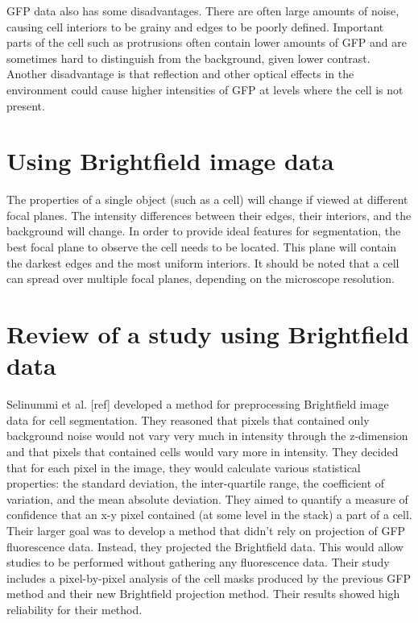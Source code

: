 GFP data also has some disadvantages. There are often large amounts of noise, causing cell interiors to be grainy and edges to be poorly defined. Important parts of the cell such as protrusions often contain lower amounts of GFP and are sometimes hard to distinguish from the background, given lower contrast. Another disadvantage is that reflection and other optical effects in the environment could cause higher intensities of GFP at levels where the cell is not present.

\section{Using Brightfield image data}

The properties of a single object (such as a cell) will change if viewed at different focal planes. The intensity differences between their edges, their interiors, and the background will change. In order to provide ideal features for segmentation, the best focal plane to observe the cell needs to be located. This plane will contain the darkest edges and the most uniform interiors. It should be noted that a cell can spread over multiple focal planes, depending on the microscope resolution.

\section{Review of a study using Brightfield data}

Selinummi et al. [ref] developed a method for preprocessing Brightfield image data for cell segmentation. They reasoned that pixels that contained only background noise would not vary very much in intensity through the z-dimension and that pixels that contained cells would vary more in intensity. They decided that for each pixel in the image, they would calculate various statistical properties: the standard deviation, the inter-quartile range, the coefficient of variation, and the mean absolute deviation. They aimed to quantify a measure of confidence that an x-y pixel contained (at some level in the stack) a part of a cell. Their larger goal was to develop a method that didn't rely on projection of GFP fluorescence data. Instead, they projected the Brightfield data. This would allow studies to be performed without gathering any fluorescence data. Their study includes a pixel-by-pixel analysis of the cell masks produced by the previous GFP method and their new Brightfield projection method. Their results showed high reliability for their method.
